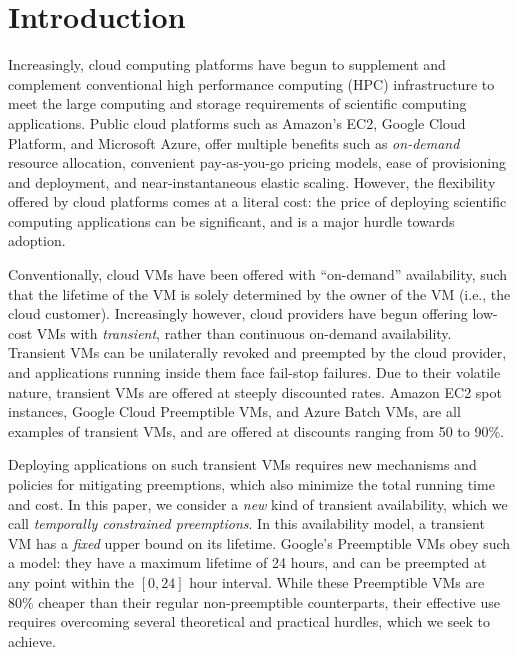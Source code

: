 \section{Introduction}
\label{sec:intro}

Increasingly, cloud computing platforms have begun to supplement and complement conventional high performance computing (HPC) infrastructure to meet the large computing and storage requirements of scientific computing applications. Public cloud platforms such as Amazon's EC2, Google Cloud Platform, and Microsoft Azure, offer multiple benefits such as \emph{on-demand} resource allocation, convenient pay-as-you-go pricing models, ease of provisioning and deployment, and near-instantaneous elastic scaling. 
However, the flexibility offered by cloud platforms comes at a literal cost: the price of deploying scientific computing applications can be significant, and is a major hurdle towards adoption. 

Conventionally, cloud VMs have been offered with ``on-demand'' availability, such that the lifetime of the VM is solely determined by the owner of the VM (i.e., the cloud customer). 
Increasingly however, cloud providers have begun offering low-cost VMs with \emph{transient}, rather than continuous on-demand availability. 
Transient VMs can be unilaterally revoked and preempted by the cloud provider, and applications running inside them face fail-stop failures. 
Due to their volatile nature, transient VMs are offered at steeply discounted rates. Amazon EC2 spot instances, Google Cloud Preemptible VMs, and Azure Batch VMs, are all examples of transient VMs, and are offered at discounts ranging from 50 to 90\%.  


Deploying applications on such transient VMs requires new mechanisms and policies for mitigating preemptions, which also minimize the total running time and cost.
%
In this paper, we consider a \emph{new} kind of transient availability, which we call \emph{temporally constrained preemptions}.
In this availability model, a transient VM has a \emph{fixed} upper bound on its lifetime.
Google's Preemptible VMs obey such a model: they have a maximum lifetime of 24 hours, and can be preempted at any point within the $[0, 24]$ hour interval.
While these Preemptible VMs are 80\% cheaper than their regular non-preemptible counterparts, their effective use requires overcoming several theoretical and practical hurdles, which we seek to achieve.

